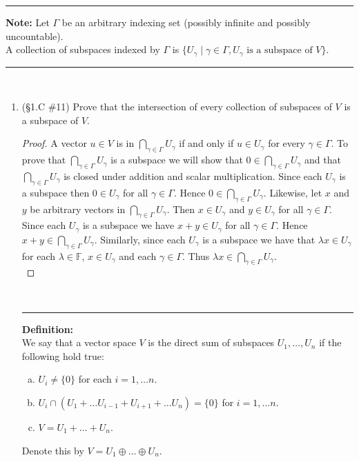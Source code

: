 \documentclass[12pt,letterpaper]{article}
\theoremstyle{plain}
\theoremstyle{definition}
\begin{document}
\hrule
\vspace{.1in}
 {\bf Note:} Let $\Gamma$ be an arbitrary indexing set (possibly infinite and possibly uncountable).\\ \indent A collection of subspaces indexed by $\Gamma$ is $\{U_\gamma \mid \gamma\in \Gamma, U_\gamma\text{ is a subspace of } V\}$.\\
\hrule
\ \\
\begin{enumerate}[1.]
\item (\S 1.C \#11) Prove that the intersection of every collection of subspaces of $V$ is a subspace of $V$. 
\begin{proof} A vector $u\in V$ is in $\bigcap_{\gamma \in \Gamma}U_\gamma$ if and only if $u\in U_\gamma$ for every $\gamma\in \Gamma$. To prove that $\bigcap_{\gamma \in \Gamma}U_\gamma$ is a subspace we will show that $0\in \bigcap_{\gamma \in \Gamma}U_\gamma$ and that $\bigcap_{\gamma \in \Gamma}U_\gamma$ is closed under addition and scalar multiplication. Since each $U_\gamma$ is a subspace then $0\in U_\gamma$ for all $\gamma \in \Gamma$. Hence $0\in  \bigcap_{\gamma\in \Gamma} U_\gamma$. Likewise, let $x$ and $y$ be arbitrary vectors in $ \bigcap_{\gamma\in \Gamma}U_\gamma$. Then $x\in U_\gamma$ and $y\in U_\gamma$ for all $\gamma \in \Gamma$. Since each $U_\gamma$ is a subspace we have $x+y\in U_\gamma $ for all $\gamma \in \Gamma$. Hence $x+y\in \bigcap_{\gamma\in \Gamma}U_\gamma$. Similarly, since each $U_\gamma$ is a subspace we have that $\lambda x\in U_\gamma$ for each $\lambda \in \mathbb{F}$, $x\in U_\gamma$ and each $\gamma \in \Gamma$. Thus $\lambda x\in \bigcap_{\gamma\in \Gamma} U_\gamma$. \\
\end{proof}
\ \\
\hrule 
{\bf Definition:}\vspace{.1in}\\
We say that a vector space $V$ is the direct sum of subspaces $U_1, \ldots ,U_n$ if the following hold true:
\begin{enumerate}[(a)]
\item $U_i\neq \{0\}$ for each $i=1, \ldots n$. 
\item $U_i\cap (U_1+\ldots U_{i-1}+U_{i+1}+\ldots U_n)=\{0\}$ for $i=1,\ldots n$. 
\item $V=U_1+\ldots +U_n$. 
\end{enumerate}
Denote this by $V=U_1\oplus\ldots \oplus U_n$. \\


\end{enumerate}
\end{document}
